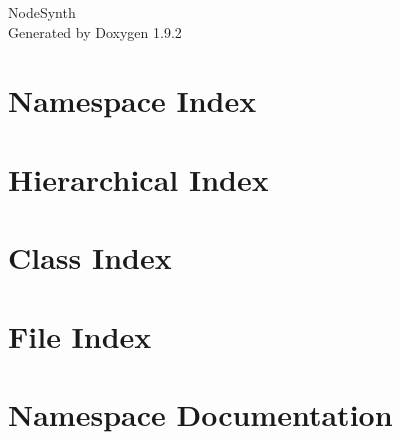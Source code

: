 \documentclass[twoside]{book}
\newcommand{\+}{\discretionary{\mbox{\scriptsize$\hookleftarrow$}}{}{}}
\newcommand{\clearemptydoublepage}{%
    \newpage{\pagestyle{empty}\cleardoublepage}%
  }
\begin{document}
  \raggedbottom
    \hypersetup{pageanchor=false,
                bookmarksnumbered=true,
                pdfencoding=unicode
               }
  \begin{titlepage}
  \vspace*{7cm}
  \begin{center}%
  {\Large Node\+Synth}\\
  \vspace*{1cm}
  {\large Generated by Doxygen 1.9.2}\\
  \end{center}
  \end{titlepage}
  \clearemptydoublepage
  \tableofcontents
  \clearemptydoublepage
  \hypersetup{pageanchor=true}
\chapter{Namespace Index}

\chapter{Hierarchical Index}

\chapter{Class Index}

\chapter{File Index}

\chapter{Namespace Documentation}

\end{document}
